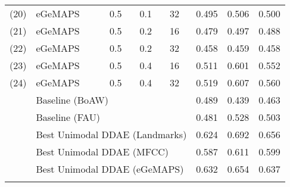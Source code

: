\begin{table}[htb]
\begin{tabular}{l|p{1.8cm}|p{1.25cm}|l|p{1.2cm}|l|l|l}
        (20) & eGeMAPS & 0.5 & 0.1 & 32 & 0.495 & 0.506 & 0.500 \\
        (21) & eGeMAPS & 0.5 & 0.2 & 16 & 0.479 & 0.497 & 0.488 \\
        (22) & eGeMAPS & 0.5 & 0.2 & 32 & 0.458 & 0.459 & 0.458  \\
        (23) & eGeMAPS & 0.5 & 0.4 & 16 & 0.511 & 0.601 & 0.552 \\
        (24) & eGeMAPS & 0.5 & 0.4 & 32 & 0.519 & 0.607 & 0.560 \\
        \hline
        & \multicolumn{4}{l|}{Baseline (BoAW)} & 0.489 & 0.439 & 0.463 \\
        & \multicolumn{4}{l|}{Baseline (FAU)} & 0.481 & 0.528 & 0.503 \\
        \hline
        & \multicolumn{4}{l|}{Best Unimodal DDAE (Landmarks)} & 0.624 & 0.692 & 0.656 \\
        & \multicolumn{4}{l|}{Best Unimodal DDAE (MFCC)} & 0.587 & 0.611 & 0.599 \\
        & \multicolumn{4}{l|}{Best Unimodal DDAE (eGeMAPS)} & 0.632 & 0.654 & 0.637 \\
    \Xhline{2\arrayrulewidth}
    \end{tabular}
    \label{tab:bimodal_res_full}
\end{table}


